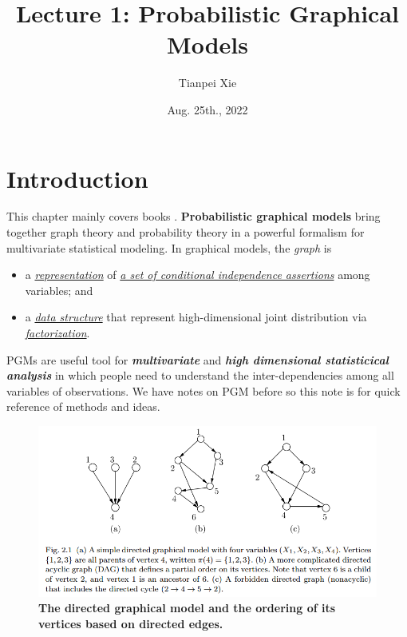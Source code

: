 \documentclass[11pt]{article}
\begin{document}
\title{Lecture 1: Probabilistic Graphical Models}
\author{Tianpei Xie}
\date{Aug. 25th., 2022 }
\maketitle
\tableofcontents
\newpage
\allowdisplaybreaks
\section{Introduction}
This chapter mainly covers books \citep{wainwright2008graphical, koller2009probabilistic}.  \textbf{Probabilistic graphical models} bring together graph theory and probability theory in a powerful formalism for multivariate statistical modeling. In graphical models, the \emph{graph} is
\begin{itemize}
\item a  \emph{\underline{representation}} of \emph{\underline{a set of conditional independence assertions}}  among variables; and
\item a \emph{\underline{data structure}} that represent high-dimensional joint distribution via \underline{\emph{factorization}}.
\end{itemize}
PGMs are useful tool for \emph{\textbf{multivariate}} and \emph{\textbf{high dimensional statisticical analysis}} in which people need to understand the inter-dependencies among all variables of observations.  We have notes on PGM before so this note is for quick reference of methods and ideas. 

\begin{figure}
\begin{minipage}[t]{1\linewidth}
  \centering
  \centerline{\includegraphics[scale = 0.45]{directed_graphical_model_ordering.png}}
\end{minipage}
\caption{\footnotesize{\textbf{The directed graphical model and the ordering of its vertices based on directed edges.}}}
\label{fig: directed_graphical_model_ordering}
\end{figure}
\end{document}
